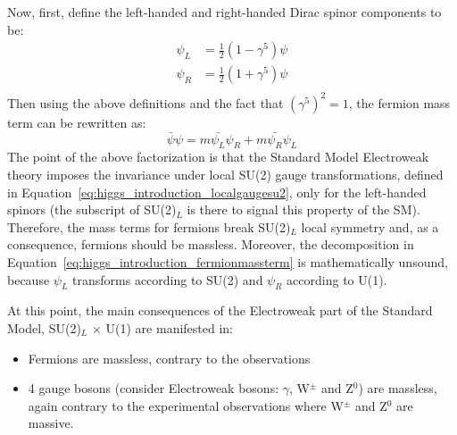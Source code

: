 Now, first, define the left-handed and right-handed Dirac spinor components to be:
\begin{subequations}\label{eq:higgs_introduction_chiralprojections}
\begin{align}
    \psi_L& = \frac{1}{2}(1 - \gamma^{5})\psi\\
    \psi_R& = \frac{1}{2}(1 + \gamma^{5})\psi\\
\end{align}
\end{subequations}
Then using the above definitions and the fact that $(\gamma^5)^2 = 1$, the fermion mass term can be rewritten as:
\begin{equation}\label{eq:higgs_introduction_fermionmassterm}
    \bar{\psi}\psi = m \bar{\psi_L}\psi_R + m \bar{\psi_R}\psi_L
\end{equation}
The point of the above factorization is that the Standard Model Electroweak theory imposes the invariance under local SU(2) gauge transformations, defined in Equation~\ref{eq:higgs_introduction_localgaugesu2}, only for the left-handed spinors (the subscript of SU(2)$_L$ is there to signal this property of the SM). Therefore, the mass terms for fermions break SU(2)$_L$ local symmetry and, as a consequence, fermions should be massless. Moreover, the decomposition in Equation~\ref{eq:higgs_introduction_fermionmassterm} is mathematically unsound, because $\psi_L$ transforms according to SU(2) and $\psi_R$ according to U(1).

At this point, the main consequences of the Electroweak part of the Standard Model, SU(2)$_L$ $\times$ U(1) are manifested in:
\begin{itemize}
    \item Fermions are massless, contrary to the observations
    \item 4 gauge bosons (consider Electroweak bosons: $\gamma$, W$^{\pm}$ and Z$^0$) are massless, again contrary to the experimental observations where W$^{\pm}$ and Z$^0$ are massive.
\end{itemize}

